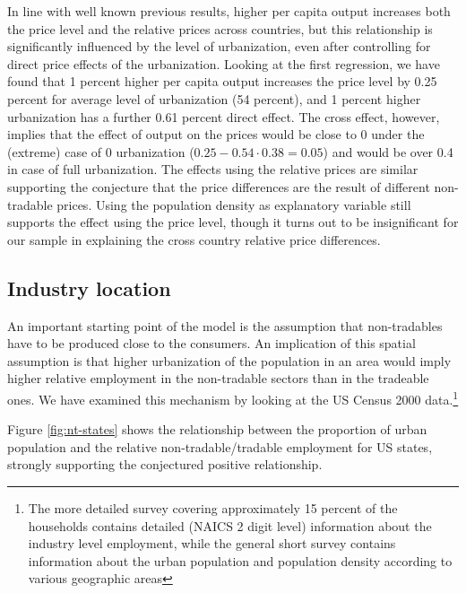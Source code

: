 \documentclass[12pt]{article}
\begin{document}
In line with well known previous results, higher per capita output
increases both the price level and the relative prices across
countries, but this relationship is significantly influenced by the
level of urbanization, even after controlling for direct price
effects of the urbanization. Looking at the first regression, we
have found that 1 percent higher per capita output increases the price
level by 0.25 percent for average level of urbanization (54 percent), and 1 percent
higher urbanization has a further 0.61 percent direct effect. The cross
effect, however, implies that the effect of output on the prices
would be close to 0 under the (extreme) case of 0 urbanization
($0.25-0.54\cdot0.38=0.05$) and would be over 0.4 in case of full
urbanization. The effects using the relative prices are similar
supporting the conjecture that the price differences are the result
of different non-tradable prices. Using the population density as
explanatory variable still supports the effect using the price
level, though it turns out to be insignificant for our sample in
explaining the cross country relative price differences.

\subsection{Industry location}
An important starting point of the model is the assumption that
non-tradables have to be produced close to the consumers. An
implication of this spatial assumption is that higher urbanization
of the population in an area would imply higher relative employment
in the non-tradable sectors than in the tradeable ones. We have
examined this mechanism by looking at the US Census 2000
data.\footnote{The more detailed survey covering approximately 15 percent
of the households contains detailed (NAICS 2 digit level)
information about the industry level employment, while the general
short survey contains information about the urban population and
population density according to various geographic areas}

Figure \ref{fig:nt-states} shows the relationship between the proportion of urban
population and the relative non-tradable/tradable employment for US
states, strongly supporting the conjectured positive relationship.
\end{document}
